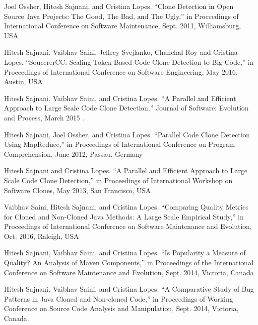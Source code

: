 \documentclass[a4paper]{article}
\begin{document}
\begin{small}

\begin{thebibliography}{}


 Joel Ossher, Hitesh Sajnani, and Cristina Lopes. “Clone Detection in Open Source Java Projects: The Good, The Bad, and The Ugly,” in Proceedings of International Conference on Software Maintenance, Sept. 2011, Williamsburg, USA 

Hitesh Sajnani, Vaibhav Saini, Jeffrey Svejlanko, Chanchal Roy and Cristina Lopes.
“SoucererCC: Scaling Token-Based Code Clone Detection to Big-Code,” in Proceedings
of International Conference on Software Engineering, May 2016, Austin, USA  


Hitesh Sajnani, Vaibhav Saini, and Cristina Lopes. “A Parallel and Efficient Approach to Large Scale Code Clone Detection,” Journal of Software: Evolution and Process, March 2015 .

Hitesh Sajnani, Joel Ossher, and Cristina Lopes. “Parallel Code Clone Detection Using
MapReduce,” in Proceedings of International Conference on Program Comprehension, June
2012, Passau, Germany


Hitesh Sajnani and Cristina Lopes. “A Parallel and Efficient Approach to Large Scale
Code Clone Detection,” in Proceedings of International Workshop on Software Clones,
May 2013, San Francisco, USA

Vaibhav Saini, Hitesh Sajnani, and Cristina Lopes. “Comparing Quality Metrics for
Cloned and Non-Cloned Java Methods: A Large Scale Empirical Study,” in Proceedings
of International Conference on Software Maintenance and Evolution, Oct. 2016,
Raleigh, USA

Hitesh Sajnani, Vaibhav Saini, and Cristina Lopes. “Is Popularity a Measure of Quality?
An Analysis of Maven Components,” in Proceedings of the International Conference on
Software Maintenance and Evolution, Sept. 2014, Victoria, Canada

Hitesh Sajnani, Vaibhav Saini, and Cristina Lopes. “A Comparative Study of Bug
Patterns in Java Cloned and Non-cloned Code,” in Proceedings of Working Conference
on Source Code Analysis and Manipulation, Sept. 2014, Victoria, Canada.


\end{thebibliography}
\end{small}
\end{document}

